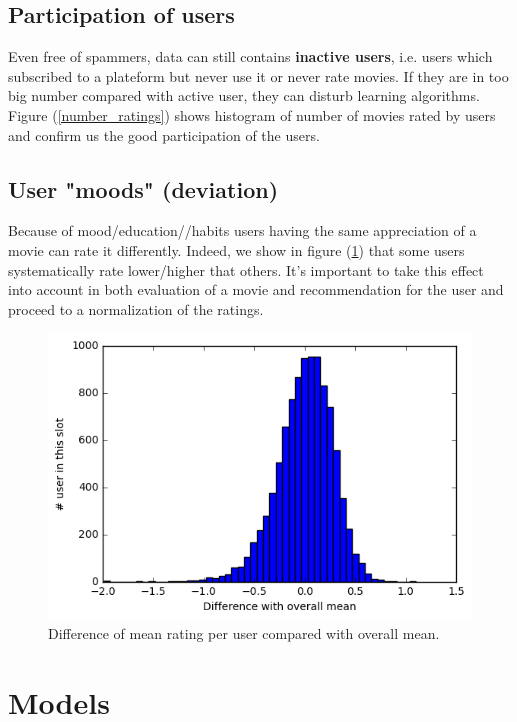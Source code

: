 \documentclass[10pt,conference,compsocconf]{IEEEtran}
\begin{document}
\subsection{Participation of users}

Even free of spammers, data can still contains \textbf{inactive users}, i.e. users which subscribed to a plateform but never use it or never rate movies. If they are in too big number compared with active user, they can disturb learning algorithms. Figure (\ref{number_ratings}) shows histogram of number of movies rated by users and confirm us the good participation of the users.

\subsection{User "moods" (deviation)}

Because of mood/education//habits users having the same appreciation of a movie can rate it differently. Indeed, we show in figure (\ref{mood}) that some users systematically rate lower/higher that others. It's important to take this effect into account in both evaluation of a movie and recommendation for the user and proceed to a normalization of the ratings.

\begin{figure}[htbp] %
  \centering
  \includegraphics[width=\columnwidth]{img/Deviation_mean}
  \caption{Difference of mean rating per user compared with overall mean.}
  \vspace{-3mm}
  \label{mood}
\end{figure}

\section{Models}
\end{document}
